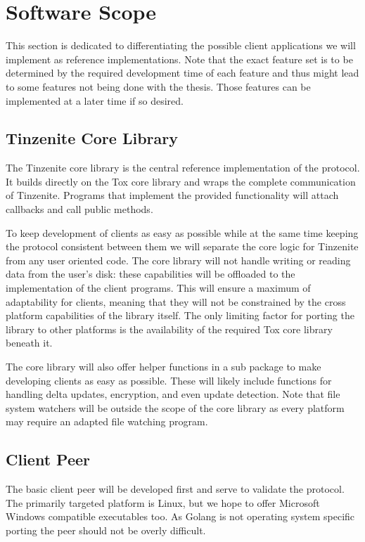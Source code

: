 \section{Software Scope}
\label{sec:Software Scope}

This section is dedicated to differentiating the possible client applications we will implement as reference implementations.
Note that the exact feature set is to be determined by the required development time of each feature and thus might lead to some features not being done with the thesis.
Those features can be implemented at a later time if so desired.

\subsection{Tinzenite Core Library}

The Tinzenite core library is the central reference implementation of the protocol.
It builds directly on the Tox core library and wraps the complete communication of Tinzenite.
Programs that implement the provided functionality will attach callbacks and call public methods.

To keep development of clients as easy as possible while at the same time keeping the protocol consistent between them we will separate the core logic for Tinzenite from any user oriented code.
The core library will not handle writing or reading data from the user's disk: these capabilities will be offloaded to the implementation of the client programs.
This will ensure a maximum of adaptability for clients, meaning that they will not be constrained by the cross platform capabilities of the library itself.
The only limiting factor for porting the library to other platforms is the availability of the required Tox core library beneath it.

The core library will also offer helper functions in a sub package to make developing clients as easy as possible.
These will likely include functions for handling delta updates, encryption, and even update detection.
Note that file system watchers will be outside the scope of the core library as every platform may require an adapted file watching program.

\subsection{Client Peer}

The basic client peer will be developed first and serve to validate the protocol.
The primarily targeted platform is Linux, but we hope to offer Microsoft Windows compatible executables too.
As Golang is not operating system specific porting the peer should not be overly difficult.

